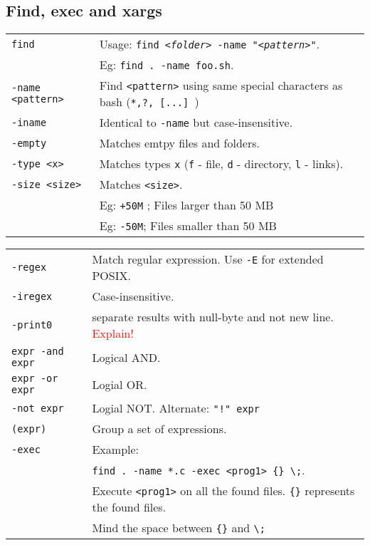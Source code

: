 \subsection{Find, exec and xargs}

\begin{tabularx}{\linewidth}{lX}
\texttt{find} & Usage: \texttt{find \textit{<folder>} -name "\textit{<pattern>}"}.\\
& Eg: \texttt{find . -name foo.sh}.\\
\texttt{-name <pattern>} & Find \texttt{<pattern>} using same special characters as bash (\texttt{*,?, [...] })\\
\texttt{-iname} & Identical to \texttt{-name} but case-insensitive.\\
\texttt{-empty} & Matches emtpy files and folders.\\
\texttt{-type <x>} & Matches types \texttt{x} (\texttt{f} - file, \texttt{d} - directory, \texttt{l} - links).\\
\texttt{-size <size>} & Matches \texttt{<size>}.\\
&  Eg: \texttt{+50M} ; Files larger than 50 MB\\
& Eg: \texttt{-50M}; Files smaller than 50 MB\\
\end{tabularx}

\begin{tabularx}{\linewidth}{lX}

\texttt{-regex} & Match regular expression. Use \texttt{-E} for extended POSIX.\\
\texttt{-iregex} & Case-insensitive.\\
\texttt{-print0} & separate results with null-byte and not new line. 
\textcolor{red}{Explain!}\\
\texttt{expr -and expr} & Logical AND.\\
\texttt{expr -or expr} & Logial OR.\\
\texttt{-not expr} & Logial NOT. Alternate: \texttt{"!" expr}\\
\texttt{(expr)} & Group a set of expressions.\\
\texttt{-exec} & Example: \\
 & \texttt{find . -name *.c -exec <prog1> \{\} \textbackslash ;}.\\
 & Execute \texttt{<prog1>} on all the found files. \texttt{\{\}} represents the found files. \\
 & Mind the space between \texttt{\{\}} and \texttt{\textbackslash;}\\
 
\hline

\end{tabularx}





